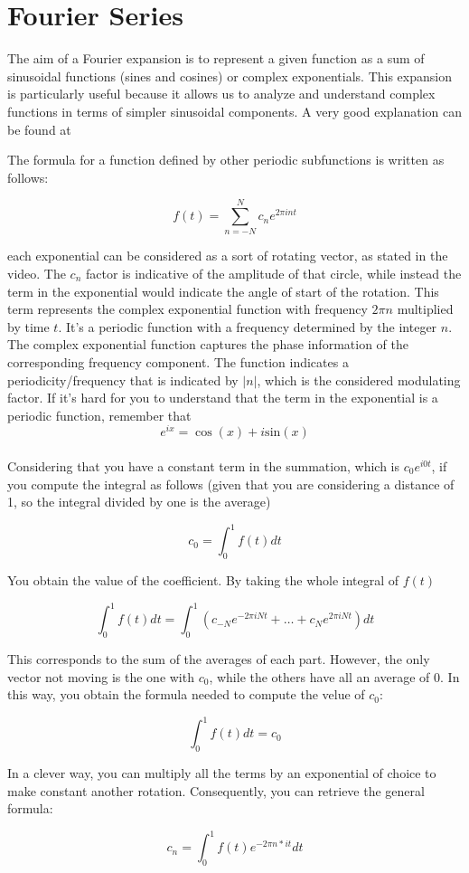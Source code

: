 \section{Fourier Series} \label{chap: fourier}

The aim of a Fourier expansion is to represent a given function as a sum of sinusoidal functions (sines and cosines) or complex exponentials. This expansion is particularly useful because it allows us to analyze and understand complex functions in terms of simpler sinusoidal components. A very good explanation can be found at

The formula for a function defined by other periodic subfunctions is written as follows:

\begin{equation}
    f(t) = \sum_{n = -N}^{N}{c_n e^{2 \pi int}}
\end{equation}

each exponential can be considered as a sort of rotating vector, as stated in the video. The $c_n$ factor is indicative of the amplitude of that circle, while instead the term in the exponential would indicate the angle of start of the rotation. This term represents the complex exponential function with frequency $2 \pi n$ multiplied by time $t$. It's a periodic function with a frequency determined by the integer $n$. The complex exponential function captures the phase information of the corresponding frequency component. The function indicates a periodicity/frequency that is indicated by $|n|$, which is the considered modulating factor.
If it's hard for you to understand that the term in the exponential is a periodic function, remember that
$$
e^{ix} = \cos{(x)} + i \text{sin}(x)
$$
\\
Considering that you have a constant term in the summation, which is $c_0 e^{i0t}$, if you compute the integral as follows (given that you are considering a distance of 1, so the integral divided by one is the average)

$$
c_0 = \int_0^1{f(t)dt}
$$

You obtain the value of the coefficient. By taking the whole integral of $f(t)$

$$
\int_0^1{f(t)dt} = \int_0^1{(c_{-N} e^{-2 \pi iNt} + \dots + c_{N} e^{2 \pi iNt})dt}
$$

This corresponds to the sum of the averages of each part. However, the only vector not moving is the one with $c_0$, while the others have all an average of 0. In this way, you obtain the formula needed to compute the velue of $c_0$:

\begin{equation}
    \int_0^1{f(t)dt} = c_0
\end{equation}

In a clever way, you can multiply all the terms by an exponential of choice to make constant another rotation. Consequently, you can retrieve the general formula:

\begin{equation}
    c_n = \int_0^1{f(t) e^{-2 \pi n * it} dt}
\end{equation}

